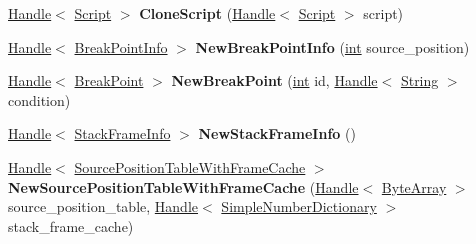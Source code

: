 \begin{DoxyCompactItemize}
\mbox{\hyperlink{classv8_1_1internal_1_1Handle}{Handle}}$<$ \mbox{\hyperlink{classv8_1_1internal_1_1Script}{Script}} $>$ {\bfseries Clone\+Script} (\mbox{\hyperlink{classv8_1_1internal_1_1Handle}{Handle}}$<$ \mbox{\hyperlink{classv8_1_1internal_1_1Script}{Script}} $>$ script)
\item 
\mbox{\label{classv8_1_1internal_1_1Factory_aa91c847e1640d4c3f810f4368ffa4f9e}} 
\mbox{\hyperlink{classv8_1_1internal_1_1Handle}{Handle}}$<$ \mbox{\hyperlink{classv8_1_1internal_1_1BreakPointInfo}{Break\+Point\+Info}} $>$ {\bfseries New\+Break\+Point\+Info} (\mbox{\hyperlink{classint}{int}} source\+\_\+position)
\item 
\mbox{\label{classv8_1_1internal_1_1Factory_aabdafdcba6b3b3facde8470b19fc7e87}} 
\mbox{\hyperlink{classv8_1_1internal_1_1Handle}{Handle}}$<$ \mbox{\hyperlink{classv8_1_1internal_1_1BreakPoint}{Break\+Point}} $>$ {\bfseries New\+Break\+Point} (\mbox{\hyperlink{classint}{int}} id, \mbox{\hyperlink{classv8_1_1internal_1_1Handle}{Handle}}$<$ \mbox{\hyperlink{classv8_1_1internal_1_1String}{String}} $>$ condition)
\item 
\mbox{\label{classv8_1_1internal_1_1Factory_aff026a02b64b5806bd81043feb0dc56d}} 
\mbox{\hyperlink{classv8_1_1internal_1_1Handle}{Handle}}$<$ \mbox{\hyperlink{classv8_1_1internal_1_1StackFrameInfo}{Stack\+Frame\+Info}} $>$ {\bfseries New\+Stack\+Frame\+Info} ()
\item 
\mbox{\label{classv8_1_1internal_1_1Factory_a3df46c7e5995d4b4b6f5ba0ea792afb4}} 
\mbox{\hyperlink{classv8_1_1internal_1_1Handle}{Handle}}$<$ \mbox{\hyperlink{classv8_1_1internal_1_1SourcePositionTableWithFrameCache}{Source\+Position\+Table\+With\+Frame\+Cache}} $>$ {\bfseries New\+Source\+Position\+Table\+With\+Frame\+Cache} (\mbox{\hyperlink{classv8_1_1internal_1_1Handle}{Handle}}$<$ \mbox{\hyperlink{classv8_1_1internal_1_1ByteArray}{Byte\+Array}} $>$ source\+\_\+position\+\_\+table, \mbox{\hyperlink{classv8_1_1internal_1_1Handle}{Handle}}$<$ \mbox{\hyperlink{classv8_1_1internal_1_1SimpleNumberDictionary}{Simple\+Number\+Dictionary}} $>$ stack\+\_\+frame\+\_\+cache)
\item 
\mbox{\label{classv8_1_1internal_1_1Factory_a0fae7e1c22f1612915ede1ff10b19dfd}} 

\end{DoxyCompactItemize}
